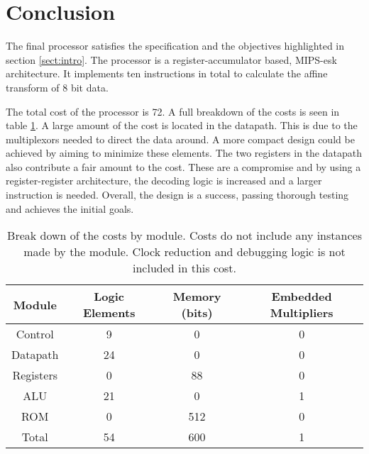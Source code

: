 

\section{Conclusion}

The final processor satisfies the specification and the objectives highlighted in section \ref{sect:intro}.
The processor is a register-accumulator based, MIPS-esk  architecture. 
It implements ten instructions in total to calculate the affine transform of 8 bit data.

The total cost of the processor is 72.
A full breakdown of the costs is seen in table \ref{tab:costs}.
A large amount of the cost is located in the datapath. 
This is due to the multiplexors needed to direct the data around. 
A more compact design could be achieved by aiming to minimize these elements. 
The two registers in the datapath also contribute a fair amount to the cost. 
These are a compromise and by using a register-register architecture, the decoding logic is increased and a larger instruction is needed.
Overall, the design is a success, passing thorough testing and achieves the initial goals. 


\begin{table}
\caption{Break down of the costs by module. Costs do not include any instances made by the module. Clock reduction and debugging logic is not included in this cost.}
\label{tab:costs}
\begin{tabular}{cccc} \toprule
Module		& Logic Elements	& Memory (bits)	& Embedded Multipliers \\ \midrule
Control		& 9			& 0		& 0	\\
Datapath	& 24			& 0		& 0	\\
Registers	& 0			& 88		& 0	\\
ALU		& 21			& 0		& 1	\\
ROM		& 0			& 512		& 0 	\\ \midrule
Total 		& 54			& 600		& 1 	\\ \bottomrule
\end{tabular}
\end{table}



